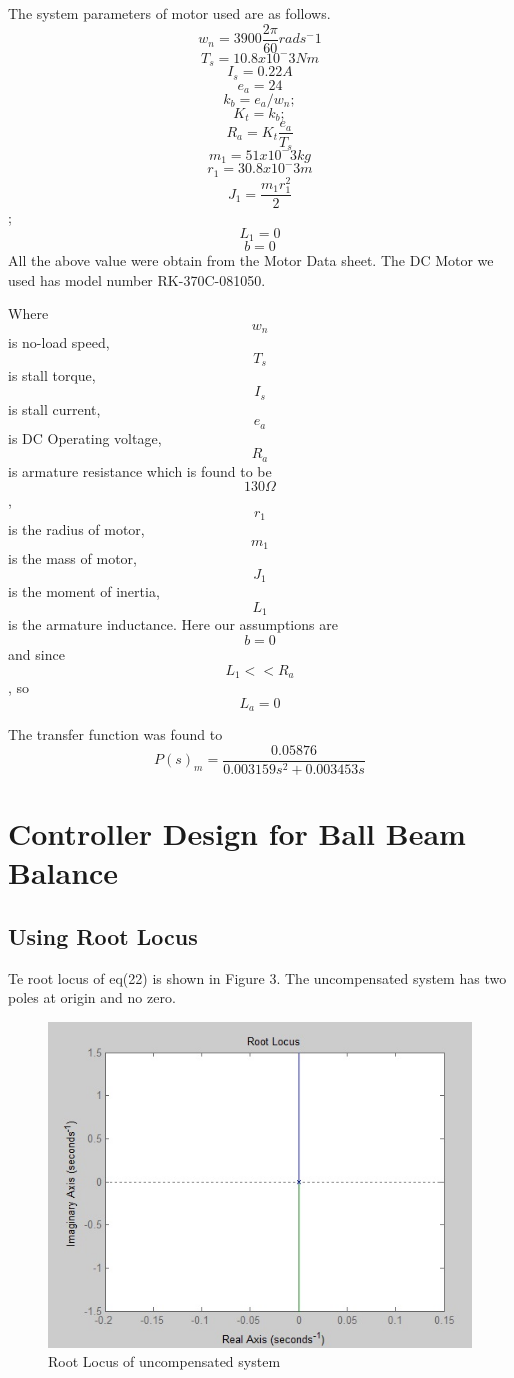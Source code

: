 \documentclass{article}
\begin{document}
The system parameters of motor used are as follows.
\[w_n = 3900 \frac{2 \pi}{60} rads^-1\]
\[T_s = 10.8x10^-3 Nm\]
\[I_s = 0.22 A\]
\[e_a = 24\]
\[k_b = e_a/w_n;\]
\[K_t = k_b; \]
\[R_a = K_t \frac{e_a}{T_s}\]
\[m_1 = 51x10^-3 kg\]
\[r_1 = 30.8x10^-3 m\]
\[J_1 = \frac{m_1 r_1^2}{2}\];
\[L_1 = 0\]
\[b = 0\]
All the above value were obtain from the Motor Data sheet. The DC Motor we used has model number RK-370C-081050.

Where \[w_n\] is no-load speed, \[T_s\] is stall torque, \[I_s\] is stall current, \[e_a\] is DC Operating voltage, \[R_a\] is armature resistance which is found to be \[130\Omega\], \[r_1\] is the radius of motor, \[m_1\] is the mass of motor, \[J_1\] is the moment of inertia, \[L_1\] is the armature inductance. Here our assumptions are \[b=0\] and since \[L_1<<R_a\], so \[L_a=0\]

The transfer function was found to
\begin{equation} \label{eq:1}
P(s)_m = \frac{0.05876}{  0.003159 s^2 + 0.003453 s}
 \end{equation}
 

\section{Controller Design for Ball Beam Balance}

\subsection{Using Root Locus}
Te root locus of eq(22) is shown in Figure 3. The uncompensated system has two poles at origin and no zero.
\begin{figure}[h]
  \includegraphics[width=\linewidth]{root_locus_uc.jpg}
  \caption{Root Locus of uncompensated system}
  \label{fig:boat1}
\end{figure}
\end{document}
